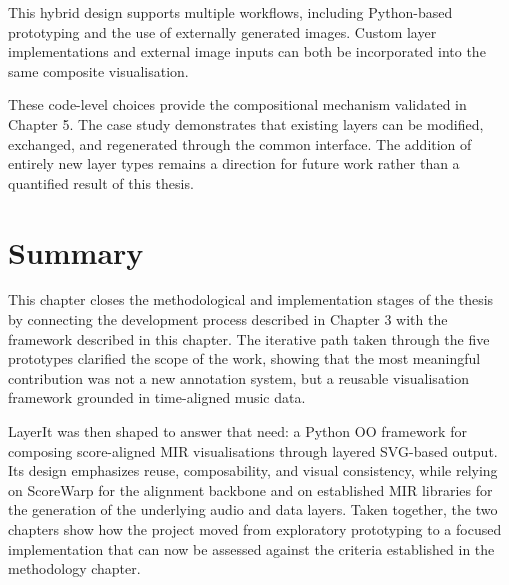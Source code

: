 This hybrid design supports multiple workflows, including Python-based prototyping and the use of externally generated images. Custom layer implementations and external image inputs can both be incorporated into the same composite visualisation.

These code-level choices provide the compositional mechanism validated in Chapter 5. The case study demonstrates that existing layers can be modified, exchanged, and regenerated through the common interface. The addition of entirely new layer types remains a direction for future work rather than a quantified result of this thesis.

\section{Summary}
This chapter closes the methodological and implementation stages of the thesis by connecting the development process described in Chapter 3 with the framework described in this chapter. The iterative path taken through the five prototypes clarified the scope of the work, showing that the most meaningful contribution was not a new annotation system, but a reusable visualisation framework grounded in time-aligned music data.

LayerIt was then shaped to answer that need: a Python OO framework for composing score-aligned MIR visualisations through layered SVG-based output. Its design emphasizes reuse, composability, and visual consistency, while relying on ScoreWarp for the alignment backbone and on established MIR libraries for the generation of the underlying audio and data layers. Taken together, the two chapters show how the project moved from exploratory prototyping to a focused implementation that can now be assessed against the criteria established in the methodology chapter.
